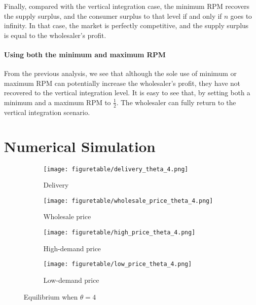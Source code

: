 \documentclass[12pt]{article}
\begin{document}
Finally, compared with the vertical integration case, the minimum RPM recovers the supply surplus, and the consumer surplus to that level if and only if $n$ goes to infinity. In that case, the market is perfectly competitive, and the supply surplus is equal to the wholesaler's profit. 

\paragraph{Using both the minimum and maximum RPM}
From the previous analysis, we see that although the sole use of minimum or maximum RPM can potentially increase the wholesaler's profit, they have not recovered to the vertical integration level. It is easy to see that, by setting both a minimum and a maximum RPM to $\frac{1}{2}$. The wholesaler can fully return to the vertical integration scenario. 

\section{Numerical Simulation}

\begin{figure}[tbp]
	\begin{subfigure}{.5\textwidth}
		\centering
		\texttt{[image: figuretable/delivery\_theta\_4.png]}  
		\caption{Delivery}
		\label{fig:equilibrium_comparison_theta_4_delivery}
	\end{subfigure}
	\begin{subfigure}{.5\textwidth}
		\centering
		\texttt{[image: figuretable/wholesale\_price\_theta\_4.png]} 
		\caption{Wholesale price}
		\label{fig:equilibrium_comparison_theta_4_wholesale}
	\end{subfigure}
	\newline
	\begin{subfigure}{.5\textwidth}
		\centering
		\texttt{[image: figuretable/high\_price\_theta\_4.png]} 
		\caption{High-demand price}
		\label{fig:equilibrium_comparison_theta_4_high_price}
	\end{subfigure}
	\begin{subfigure}{.5\textwidth}
		\centering
		\texttt{[image: figuretable/low\_price\_theta\_4.png]} 
		\caption{Low-demand price}
		\label{fig:equilibrium_comparison_theta_4_low_price}
	\end{subfigure}
	\caption{Equilibrium when $\theta = 4$}
	\label{fig:equilibrium_comparison_theta_4}
	\footnotesize
\end{figure}
\end{document}
